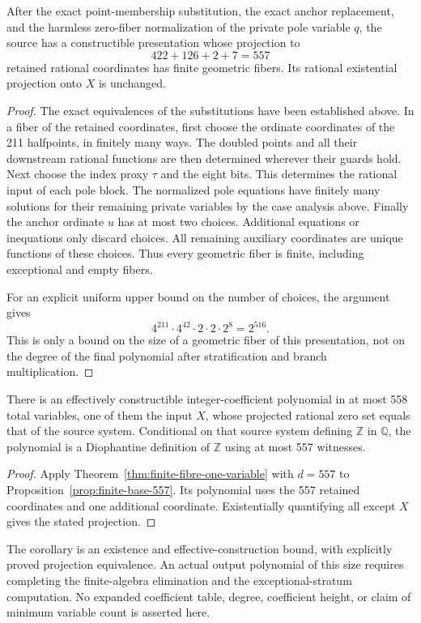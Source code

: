 \begin{proposition}\label{prop:finite-base-557}
After the exact point-membership substitution, the exact anchor
replacement, and the harmless zero-fiber normalization of the private
pole variable $q$, the source has a constructible presentation whose
projection to
\[
 422+126+2+7=557
\]
retained rational coordinates has finite geometric fibers.
Its rational existential projection onto $X$ is unchanged.
\end{proposition}
\begin{proof}
The exact equivalences of the substitutions have been established
above.  In a fiber of the retained coordinates, first choose the
ordinate coordinates of the 211 halfpoints, in finitely many ways.
The doubled points and all their downstream rational functions are
then determined wherever their guards hold.  Next choose the index
proxy $\tau$ and the eight bits.  This determines the rational input
of each pole block.  The normalized pole equations have finitely many
solutions for their remaining private variables by the case analysis
above.  Finally the anchor ordinate $u$ has at most two choices.
Additional equations or inequations only discard choices.
All remaining auxiliary coordinates are unique functions of these
choices.  Thus every geometric fiber is finite, including exceptional
and empty fibers.

For an explicit uniform upper bound on the number of choices, the
argument gives
\[
 4^{211}\cdot4^{42}\cdot2\cdot2\cdot2^8=2^{516}.
\]
This is only a bound on the size of a geometric fiber of this
presentation, not on the degree of the final polynomial after
stratification and branch multiplication.
\end{proof}

\begin{corollary}\label{cor:558-variables}
There is an effectively constructible integer-coefficient polynomial
in at most 558 total variables, one of them the input $X$, whose
projected rational zero set equals that of the source system.
Conditional on that source system defining $\mathbb Z$ in $\mathbb Q$,
the polynomial is a Diophantine definition of $\mathbb Z$ using at
most 557 witnesses.
\end{corollary}
\begin{proof}
Apply Theorem~\ref{thm:finite-fibre-one-variable} with $d=557$ to
Proposition~\ref{prop:finite-base-557}.  Its polynomial uses the 557
retained coordinates and one additional coordinate.  Existentially
quantifying all except $X$ gives the stated projection.
\end{proof}

The corollary is an existence and effective-construction bound, with
explicitly proved projection equivalence.  An actual output polynomial
of this size requires completing the finite-algebra elimination and
the exceptional-stratum computation.  No expanded coefficient table,
degree, coefficient height, or claim of minimum variable count is
asserted here.

